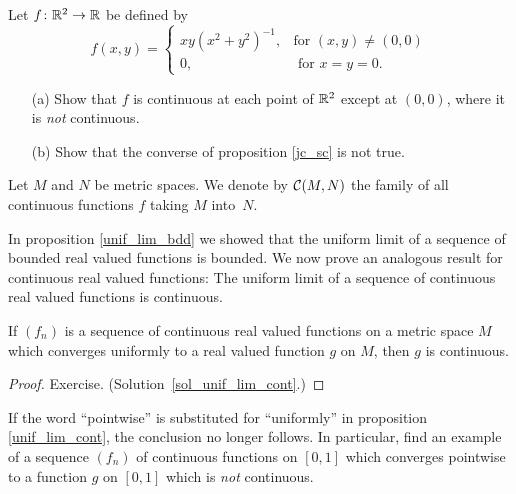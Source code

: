 \begin{prob}\label{sc_n_jc} Let $f\colon \mathbb{R}^2 \rightarrow \mathbb{R}$ be defined by
  \[f(x,y) = \begin{cases} xy(x^2+y^2)^{-1},
                    &\text{for $(x,y) \ne (0,0)$} \\
                 0, &\text{ for $x = y = 0$.}
             \end{cases}\]
 \begin{enumerate}
  \item[(a)] Show that $f$ is continuous at each point of $\mathbb{R}^2$ except at $(0,0)$, where it is
\emph{not} continuous.
  \item[(b)] Show that the converse of proposition \ref{jc_sc} is not true.
 \end{enumerate}
\end{prob}

\begin{notn} Let $M$ and $N$ be metric spaces.  We denote by
$\mathcal{C}(M,N)$ the family of all continuous functions $f$ taking $M$ into~$N$.
\end{notn}

In proposition \ref{unif_lim_bdd} we showed that the uniform limit of a sequence of bounded real
valued functions is bounded.  We now prove an analogous result for continuous real valued
functions: The uniform limit of a sequence of continuous real valued functions is continuous.

\begin{prop}\label{unif_lim_cont} If $(f_n)$ is a sequence of continuous real valued functions
on a metric space $M$ which converges uniformly to a real valued function $g$ on $M$, then $g$ is
continuous.
\end{prop}

\begin{proof} Exercise. (Solution~\ref{sol_unif_lim_cont}.)  \ns  \end{proof}

\begin{prob} If the word ``pointwise'' is substituted for ``uniformly'' in proposition
\ref{unif_lim_cont}, the conclusion no longer follows.  In particular, find an example of a
sequence $(f_n)$ of continuous functions on $[0,1]$ which converges pointwise to a function $g$ on
$[0,1]$ which is \emph{not} continuous.
\end{prob}









